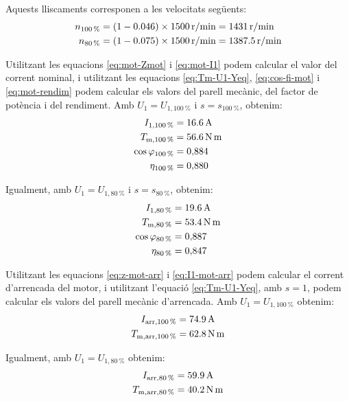 \begin{exemple}
	Aquests lliscaments corresponen a les velocitats següents:
	\begin{align*}
		n_\mathrm{\SI{100}{\%}} &= (1-\num{0,046})\times \SI{1500}{r/min} = \SI{1431}{r/min} \\
		n_\mathrm{\SI{80}{\%}} &= (1-\num{0,075})\times \SI{1500}{r/min} = \SI{1387,5}{r/min}
	\end{align*}
	
	Utilitzant les equacions \eqref{eq:mot-Zmot} i \eqref{eq:mot-I1} podem calcular el valor del corrent nominal, i utilitzant les equacions \eqref{eq:Tm-U1-Yeq}, \eqref{eq:cos-fi-mot} i \eqref{eq:mot-rendim} podem calcular els valors del parell mecànic, del factor de potència i del rendiment. Amb $U_1 = U_{1,\SI{100}{\%}}$  i $s = s_{\SI{100}{\%}}$, obtenim:
	\begin{align*}
		I_{1,\SI{100}{\%}} &= \SI{16,6}{A} \\
		T_\mathrm{m,\SI{100}{\%}} &=  \SI{56,6}{N.m} \\
		\cos\varphi_{\SI{100}{\%}} &=  0{,}884 \\
		\eta_{\SI{100}{\%}} &=  0{,}880
	\end{align*}
	
	Igualment, amb $U_1 = U_{1,\SI{80}{\%}}$ i $s = s_{\SI{80}{\%}}$, obtenim:
	\pagebreak
	\begin{align*}
		I_{1,\SI{80}{\%}} &= \SI{19,6}{A} \\
		T_\mathrm{m,\SI{80}{\%}} &=  \SI{53,4}{N.m} \\
		\cos\varphi_{\SI{80}{\%}} &=  0{,}887 \\
		\eta_{\SI{80}{\%}} &=  0{,}847
	\end{align*}

	Utilitzant les equacions \eqref{eq:z-mot-arr} i \eqref{eq:I1-mot-arr} podem calcular el corrent d'arrencada del motor, i utilitzant l'equació \eqref{eq:Tm-U1-Yeq}, amb $s=1$, podem calcular els valors del parell mecànic d'arrencada. Amb $U_1 = U_{1,\SI{100}{\%}}$   obtenim:
	\vspace{-2mm}
	\begin{align*}
		I_\mathrm{arr,\SI{100}{\%}} &=  \SI{74,9}{A} \\
		T_\mathrm{m,arr,\SI{100}{\%}} &=  \SI{62,8}{N.m} 
	\end{align*}
	
	Igualment, amb $U_1 = U_{1,\SI{80}{\%}}$ obtenim:
	\vspace{-2mm}
	\begin{align*}
		I_\mathrm{arr,\SI{80}{\%}} &=  \SI{59,9}{A} \\
		T_\mathrm{m,arr,\SI{80}{\%}} &=  \SI{40,2}{N.m} 
	\end{align*}
	

\end{exemple}

